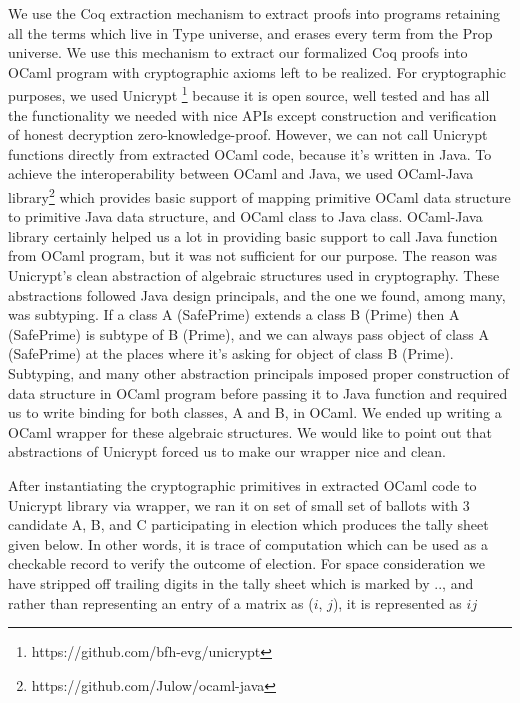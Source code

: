 \documentclass{llncs}
\begin{document}
We use the Coq extraction mechanism\cite{Letouzey:2003:NEC}  to extract
proofs into programs retaining all the terms which live in Type universe, 
and erases every term  from the Prop universe. We use this mechanism to 
extract our formalized Coq proofs into OCaml\cite{Leroy:2013:ORM} program 
with cryptographic axioms left to be realized. For cryptographic purposes, 
we used Unicrypt 
\footnote{https://github.com/bfh-evg/unicrypt}
because it is open source, well tested and has all the functionality 
we needed with nice APIs except construction and verification of 
honest decryption zero-knowledge-proof.
However, we can not call Unicrypt functions directly from extracted OCaml 
code, because it's written in Java. To achieve the interoperability 
between OCaml and Java, we used OCaml-Java library\footnote{ 
https://github.com/Julow/ocaml-java} which provides
 basic support of mapping  primitive OCaml data structure to
 primitive Java  data structure, and OCaml class to Java class. 
 OCaml-Java library certainly helped us a lot in providing basic 
 support to call Java function from OCaml program, but it was not 
 sufficient for
 our purpose. The reason was Unicrypt's clean abstraction of 
 algebraic structures used in cryptography. These abstractions followed 
 Java design principals, and the one we found, among many, was subtyping.
 If a class A (SafePrime) extends a class B (Prime) then 
 A (SafePrime) is subtype of B (Prime), 
 and we can always pass object of class A (SafePrime) at 
 the places where it's asking for object of class B (Prime). 
 Subtyping, and many other abstraction principals imposed 
 proper construction of data structure in OCaml program 
 before passing it to Java function and  
 required us to
 write binding for both classes, A and B, in OCaml. We ended up writing a
 OCaml wrapper for these algebraic structures. We would like to point out
 that abstractions of Unicrypt forced us to make our wrapper 
 nice and clean.
 
 After instantiating the  
 cryptographic primitives in extracted OCaml code 
 to Unicrypt library via wrapper, we ran it on set of
 small set of ballots with 3 candidate A, B, and C participating in election
 which produces the tally sheet given below. In other words, 
 it is trace of computation which can be used as a checkable record to verify
 the outcome of election. For space consideration we have stripped off 
 trailing digits in the tally sheet which is marked by $..$, and rather 
 than representing an entry of a matrix as ($i$, $j$), it is represented as 
 $ij$
 
\end{document}
